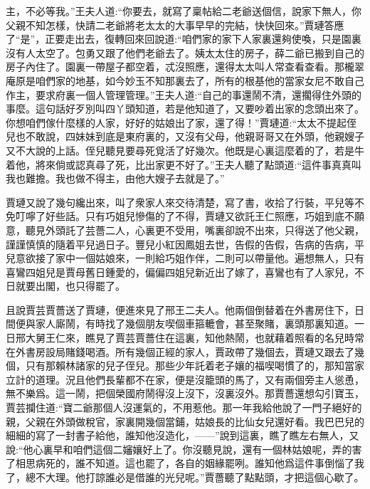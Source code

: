 \begin{parag}
主，不必等我。”王夫人道:“你要去，就寫了稟帖給二老爺送個信，說家下無人，你父親不知怎樣，快請二老爺將老太太的大事早早的完結，快快回來。”賈璉答應了“是”，正要走出去，復轉回來回說道:“咱們家的家下人家裏還夠使喚，只是園裏沒有人太空了。包勇又跟了他們老爺去了。姨太太住的房子，薛二爺已搬到自己的房子內住了。園裏一帶屋子都空着，忒沒照應，還得太太叫人常查看查看。那櫳翠庵原是咱們家的地基，如今妙玉不知那裏去了，所有的根基他的當家女尼不敢自己作主，要求府裏一個人管理管理。”王夫人道:“自己的事還鬧不清，還擱得住外頭的事麼。這句話好歹別叫四丫頭知道，若是他知道了，又要吵着出家的念頭出來了。你想咱們傢什麼樣的人家，好好的姑娘出了家，還了得！”賈璉道:“太太不提起侄兒也不敢說，四妹妹到底是東府裏的，又沒有父母，他親哥哥又在外頭，他親嫂子又不大說的上話。侄兒聽見要尋死覓活了好幾次。他既是心裏這麼着的了，若是牛着他，將來倘或認真尋了死，比出家更不好了。”王夫人聽了點頭道:“這件事真真叫我也難擔。我也做不得主，由他大嫂子去就是了。”
\end{parag}


\begin{parag}
    賈璉又說了幾句纔出來，叫了衆家人來交待清楚，寫了書，收拾了行裝，平兒等不免叮嚀了好些話。只有巧姐兒慘傷的了不得，賈璉又欲託王仁照應，巧姐到底不願意，聽見外頭託了芸薔二人，心裏更不受用，嘴裏卻說不出來，只得送了他父親，謹謹慎慎的隨着平兒過日子。豐兒小紅因鳳姐去世，告假的告假，告病的告病，平兒意欲接了家中一個姑娘來，一則給巧姐作伴，二則可以帶量他。遍想無人，只有喜鸞四姐兒是賈母舊日鍾愛的，偏偏四姐兒新近出了嫁了，喜鸞也有了人家兒，不日就要出閣，也只得罷了。
\end{parag}


\begin{parag}
    且說賈芸賈薔送了賈璉，便進來見了邢王二夫人。他兩個倒替着在外書房住下，日間便與家人廝鬧，有時找了幾個朋友喫個車箍轆會，甚至聚賭，裏頭那裏知道。一日邢大舅王仁來，瞧見了賈芸賈薔住在這裏，知他熱鬧，也就藉着照看的名兒時常在外書房設局賭錢喝酒。所有幾個正經的家人，賈政帶了幾個去，賈璉又跟去了幾個，只有那賴林諸家的兒子侄兒。那些少年託着老子孃的福喫喝慣了的，那知當家立計的道理。況且他們長輩都不在家，便是沒籠頭的馬了，又有兩個旁主人慫恿，無不樂爲。這一鬧，把個榮國府鬧得沒上沒下，沒裏沒外。那賈薔還想勾引寶玉，賈芸攔住道:“寶二爺那個人沒運氣的，不用惹他。那一年我給他說了一門子絕好的親，父親在外頭做稅官，家裏開幾個當鋪，姑娘長的比仙女兒還好看。我巴巴兒的細細的寫了一封書子給他，誰知他沒造化，——”說到這裏，瞧了瞧左右無人，又說:“他心裏早和咱們這個二嬸孃好上了。你沒聽見說，還有一個林姑娘呢，弄的害了相思病死的，誰不知道。這也罷了，各自的姻緣罷咧。誰知他爲這件事倒惱了我了，總不大理。他打諒誰必是借誰的光兒呢。”賈薔聽了點點頭，才把這個心歇了。
\end{parag}


